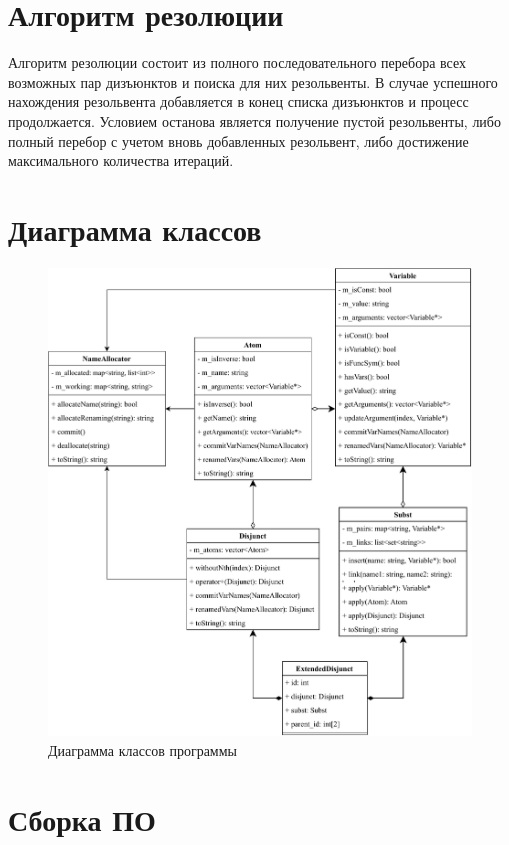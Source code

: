 \section{Алгоритм резолюции}

Алгоритм резолюции состоит из полного последовательного перебора всех возможных пар дизъюнктов и поиска для них резольвенты. В случае успешного нахождения резольвента добавляется в конец списка дизъюнктов и процесс продолжается. Условием останова является получение пустой резольвенты, либо полный перебор с учетом вновь добавленных резольвент, либо достижение максимального количества итераций.

\section{Диаграмма классов}

\begin{figure}[h!]
    \centering
    \includegraphics[width=\linewidth]{uml.pdf}
    \caption{Диаграмма классов программы}
\end{figure}

\section{Сборка ПО}

